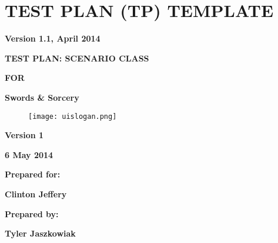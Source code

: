 \chapter{TEST PLAN (TP) TEMPLATE}

{\centering{}\bfseries\color{black}
Version 1.1, April 2014
\par}

{\centering\bfseries\color{black}
TEST PLAN: SCENARIO CLASS}

{\centering{}\bfseries\color{black}
FOR
\par}


\bigskip

{\centering{}\bfseries\color{black}
Swords \& Sorcery
\par}


\bigskip


\bigskip


\bigskip

\begin{figure}
\centering
\texttt{[image: uislogan.png]}
\end{figure}

\bigskip


\bigskip


\bigskip


\bigskip

{\centering{}\bfseries\color{black}
Version 1
\par}

{\centering{}\bfseries\color{black}
6 May 2014
\par}


\bigskip


\bigskip

{\centering{}\bfseries\color{black}
Prepared for:
\par}

{\centering{}\bfseries\color{black}
Clinton Jeffery
\par}


\bigskip


\bigskip

{\centering{}\bfseries\color{black}
Prepared by:
\par}

{\centering{}\bfseries\color{black}
Tyler Jaszkowiak
\par}

